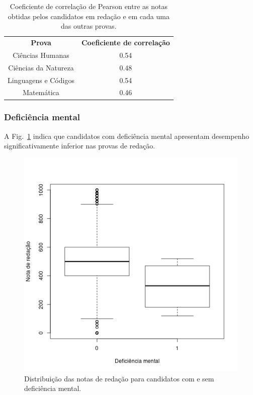 \documentclass[12pt]{article}
\newcommand{\reffig}[1]{Fig.~\ref{fig:#1}}
\begin{document}
\begin{table}[H]
\centering\begin{tabular}{ c c }
  \textbf{Prova}       & \textbf{Coeficiente de correlação} \\
  Ciências Humanas     & 0.54 \\
  Ciências da Natureza & 0.48 \\
  Linguagens e Códigos & 0.54 \\
  Matemática           & 0.46 \\
\end{tabular}
\caption{Coeficiente de correlação de Pearson entre as notas obtidas pelos candidatos em redação e em cada uma das outras provas.}
\label{tab:coeficiente-pearson-por-prova}
\end{table}

\subsubsection{Deficiência mental}
A \reffig{correlacao-deficiencia-mental} indica que candidatos com deficiência mental apresentam desempenho significativamente inferior nas provas de redação.

\begin{figure}[H]
\centering\includegraphics[width=.5\linewidth]{../correlacao_deficiencia_mental.png}
\caption{Distribuição das notas de redação para candidatos com e sem deficiência mental.}
\label{fig:correlacao-deficiencia-mental}
\end{figure}
\end{document}
